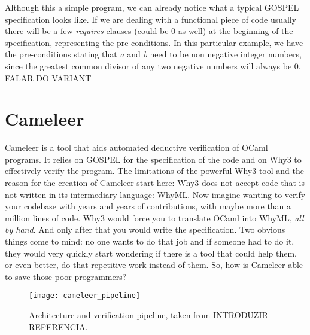 Although this a simple program, we can already notice what a typical GOSPEL specification looks like.
If we are dealing with a functional piece of code usually there will be a few \emph{requires} clauses (could be 0 as well) at the beginning of the specification, representing the pre-conditions.
In this particular example, we have the pre-conditions stating that \emph{a} and \emph{b} need to be non negative integer numbers, since the greatest common divisor of any two negative numbers will always be 0.
FALAR DO VARIANT


\section{Cameleer}
\label{sec:cameleer}

Cameleer is a tool that aids automated deductive verification of OCaml programs.
It relies on GOSPEL for the specification of the code and on Why3 to effectively verify the program.
The limitations of the powerful Why3 tool and the reason for the creation of Cameleer start here: Why3 does not accept code that is not written in its intermediary language: WhyML.
Now imagine wanting to verify your codebase with years and years of contributions, with maybe more than a million lines of code.
Why3 would force you to translate OCaml into WhyML, \emph{all by hand}. 
And only after that you would write the specification.
Two obvious things come to mind: no one wants to do that job and if someone had to do it, they would very quickly start wondering if there is a tool that could help them, or even better, do that repetitive work instead of them.
So, how is Cameleer able to save those poor programmers?

\begin{figure}[htbp]
  \centering
  \texttt{[image: cameleer\_pipeline]}
  \caption{Architecture and verification pipeline, taken from INTRODUZIR REFERENCIA.}
  \label{fig:cameleer_pipeline}
\end{figure}

